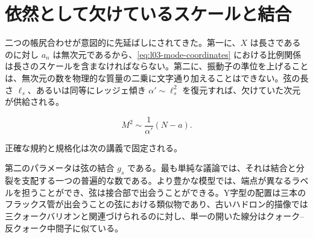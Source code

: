 \begin{classroomqa}
\end{classroomqa}

\begin{classroomqa}
\end{classroomqa}

\section{依然として欠けているスケールと結合}

二つの帳尻合わせが意図的に先延ばしにされてきた。第一に、\(X\) は長さであるのに対し \(a_n\) は無次元であるから、\eqref{eq:l03-mode-coordinates} における比例関係は長さのスケールを含まなければならない。第二に、振動子の準位を上げることは、無次元の数を物理的な質量の二乗に文字通り加えることはできない。弦の長さ \(\ell_s\)、あるいは同等にレッジェ傾き \(\alpha'\sim\ell_s^2\) を復元すれば、欠けていた次元が供給される。

\begin{equation}
  M^2\sim\frac{1}{\alpha'}(N-a).
  \label{eq:l03-dimensional-spectrum}
\end{equation}

正確な規約と規格化は次の講義で固定される。

\begin{classroomqa}
\end{classroomqa}

第二のパラメータは弦の結合 \(g_s\) である。最も単純な議論では、それは結合と分裂を支配する一つの普遍的な数である。より豊かな模型では、端点が異なるラベルを担うことができ、弦は接合部で出会うことができる。Y字型の配置は三本のフラックス管が出会うことの弦における類似物であり、古いハドロン的描像では三クォークバリオンと関連づけられるのに対し、単一の開いた線分はクォーク--反クォーク中間子に似ている。

